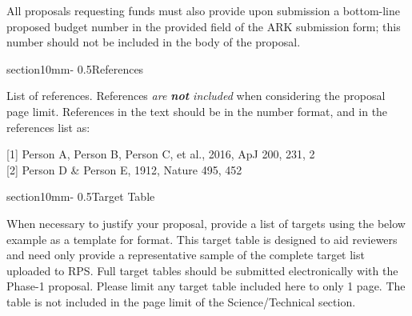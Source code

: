 \documentclass[letterpaper,12pt]{article}
\makeatletter
\renewcommand{\section}{\@startsection%
{section}{1}{0mm}{-\baselineskip}%
{0.5\baselineskip}{\normalfont\Large\bfseries}}%
\makeatother
\begin{document}
\noindent All proposals requesting funds must also provide upon submission a bottom-line proposed budget number in the provided field of the ARK submission form; this number should not be included in the body of the proposal.


\section{References}

List of references. References {\it are {\bf not} included} when considering the
proposal page limit. References in the text should be in the number format, and in the references list as:

[1] Person A, Person B, Person C, et al., 2016, ApJ 200, 231, 2\\

[2] Person D \& Person E, 1912, Nature 495, 452


\section{Target Table}

When necessary to justify your proposal, provide a list of targets using the below example as a template for format. This target table is designed to aid reviewers and need only provide a representative sample of the complete target list uploaded to RPS. Full target tables should be submitted electronically with the Phase-1 proposal. Please limit any target table included here to only 1 page. The table is not included in the page limit of the Science/Technical section. 
\end{document}
